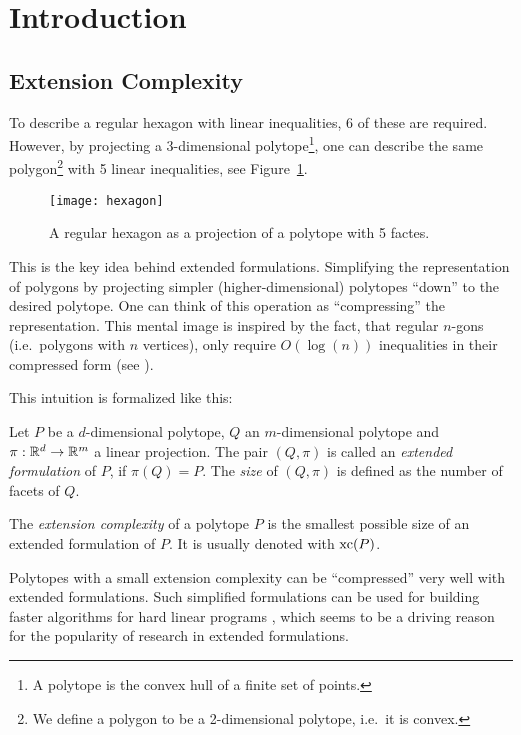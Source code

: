 \section{Introduction} 

\subsection{Extension Complexity}

To describe a regular hexagon with linear inequalities, 6 of these are required. However, by projecting a 3-dimensional polytope\footnote{A polytope is the convex hull of a finite set of points.}, one can describe the same polygon\footnote{We define a polygon to be a 2-dimensional polytope, i.e.\ it is convex.} with 5 linear inequalities, see Figure~\ref{fig:hexagon}. 

\begin{figure}[ht]
  \centering
  \texttt{[image: hexagon]}
  \caption{A regular hexagon as a projection of a polytope with 5 factes. \cite[Figure 1]{kwan2020extension}}
  \label{fig:hexagon}
\end{figure}

This is the key idea behind extended formulations. Simplifying the representation of polygons by projecting simpler (higher-dimensional) polytopes ``down'' to the desired polytope.
One can think of this operation as ``compressing'' the representation. This mental image is inspired by the fact, that regular $n$-gons (i.e.\ polygons with $n$ vertices), only require $O(\log(n))$ inequalities in their compressed form (see \cite{kaibel2010constructing}).

This intuition is formalized like this:

\begin{definition}
  Let $P$ be a $d$-dimensional polytope, $Q$ an $m$-dimensional polytope and $\pi:\mathbb{R}^d \to \mathbb{R}^m$ a linear projection.
  The pair $(Q,\pi)$ is called an \emph{extended formulation} of $P$, if $\pi(Q)=P$. The \emph{size} of $(Q,\pi)$ is defined as the number of facets of $Q$.
\end{definition}

\begin{definition}
  The \emph{extension complexity} of a polytope $P$ is the smallest possible size of an extended formulation of $P$. It is usually denoted with $\operatorname{xc}(P)$.
\end{definition}

Polytopes with a small extension complexity can be ``compressed'' very well with extended formulations.
Such simplified formulations can be used for building faster algorithms for hard linear programs \cite{yannakakis1991expressing}, which seems to be a driving reason for the popularity of research in extended formulations.


